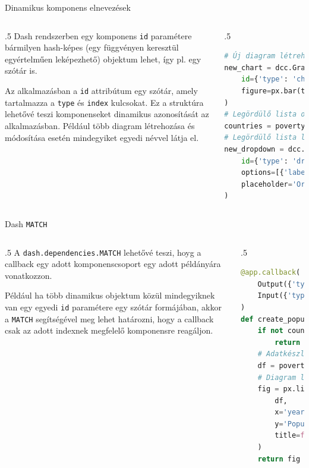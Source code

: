 \documentclass[english, aspectratio=169]{beamer}
\begin{document}
\begin{frame}[fragile]{Dinamikus komponens elnevezések}
	\begin{columns}
		\begin{column}{.5\textwidth}
			Dash rendszerben egy komponens \texttt{id} paramétere bármilyen hash-képes (egy függvényen keresztül egyértelműen leképezhető) objektum lehet, így pl. egy szótár is.\par\smallskip
			Az alkalmazásban a \texttt{id} attribútum egy szótár, amely tartalmazza a \texttt{type} és \texttt{index} kulcsokat. Ez a struktúra lehetővé teszi komponenseket dinamikus azonosítását az alkalmazásban. Például több diagram létrehozása és módosítása esetén mindegyiket egyedi névvel látja el.  
		\end{column}
		\begin{column}{.5\textwidth}
			\begin{lstlisting}[language=python]
# Új diagram létrehozása
new_chart = dcc.Graph(
	id={'type': 'chart', 'index': n_clicks},
	figure=px.bar(title=f"Diagram {n_clicks}")
)
# Legördülő lista opciók létrehozása
countries = poverty[poverty['is_country']]['Country Name'].drop_duplicates().sort_values()
# Legördülő lista létrehozása
new_dropdown = dcc.Dropdown(
	id={'type': 'dropdown', 'index': n_clicks},
	options=[{'label': c, 'value': c} for c in countries],
	placeholder='Ország kiválasztása'
)
			\end{lstlisting}
		\end{column}
	\end{columns}
\end{frame}

\begin{frame}[fragile]{Dash \texttt{MATCH}}
	\begin{columns}
		\begin{column}{.5\textwidth}
			A \texttt{dash.dependencies.MATCH} lehetővé teszi, hoyg a callback egy adott komponenscsoport egy adott példányára vonatkozzon.\par\medskip
			Például ha több dinamikus objektum közül mindegyiknek van egy egyedi \texttt{id} paramétere egy szótár formájában, akkor a \texttt{MATCH} segítségével meg lehet határozni, hogy a callback csak az adott indexnek megfelelő komponensre reagáljon.
		\end{column}
		\begin{column}{.5\textwidth}
			\begin{lstlisting}[language=python]
@app.callback(
	Output({'type': 'chart', 'index': MATCH}, 'figure'),
	Input({'type': 'dropdown', 'index': MATCH}, 'value'),
)
def create_population_chart(country):
	if not country:
		return no_update
	# Adatkészlet szűrése
	df = poverty[poverty['Country Name'] == country]
	# Diagram létrehozása
	fig = px.line(
		df,
		x='year',
		y='Population, total',
		title=f'{country} ország népessége'
	)
	return fig
			\end{lstlisting}
		\end{column}
	\end{columns}
\end{frame}
\end{document}
